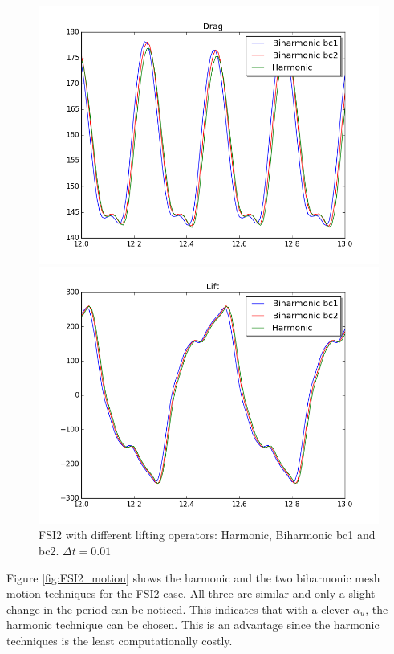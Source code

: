 \begin{figure}[H]
\begin{minipage}[b]{0.6\linewidth}
    \centering
    \includegraphics[scale=0.45]{./Verification_Validation/Mesh_motion_results/FSI2_dt001_drag.png} 
    \vspace{4ex}
  \end{minipage}%
  \begin{minipage}[b]{0.6\linewidth}
    \centering
    \includegraphics[scale=0.45]{./Verification_Validation/Mesh_motion_results/FSI2_dt001_lift.png} 
    \vspace{4ex}
  \end{minipage} 
\caption {FSI2 with different lifting operators: Harmonic, Biharmonic bc1 and bc2. $\Delta t = 0.01$}
\end{figure}

Figure \ref{fig:FSI2_motion} shows the harmonic and the two biharmonic mesh motion techniques for the FSI2 case. All three are similar and only a slight change in the period can be noticed. This indicates that with a clever $\alpha_u$, the harmonic technique can be chosen. This is an advantage since the harmonic techniques is the least computationally costly.








